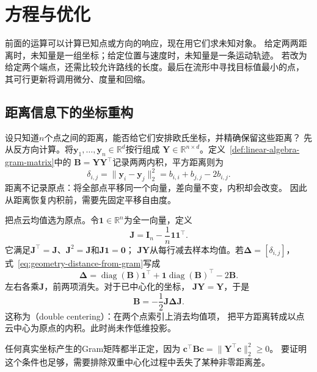 \section{方程与优化}
\label{sec:geometry-equations-optimization}

前面的运算可以计算已知点或方向的响应，现在用它们求未知对象。
给定两两距离时，未知量是一组坐标；给定位置与速度时，未知量是一条运动轨迹。
若改为给定两个端点，还需比较允许路线的长度。最后在流形中寻找目标值最小的点，
其可行更新将调用微分、度量和回缩。

\subsection{距离信息下的坐标重构}
\label{sec:geometry-distance-coordinate-embedding}

设只知道$n$个点之间的距离，能否给它们安排欧氏坐标，并精确保留这些距离？
先从反方向计算。将$\bm y_1,\ldots,\bm y_n\in\mathbb R^d$按行组成
$\bm Y\in\mathbb R^{n\times d}$。定义~\ref{def:linear-algebra-gram-matrix}中的
$\bm B=\bm Y\bm Y^\top$记录两两内积，平方距离则为
\begin{equation}
  \delta_{i,j}=\lVert\bm y_i-\bm y_j\rVert_2^2
  =b_{i,i}+b_{j,j}-2b_{i,j}.
  \label{eq:geometry-distance-from-gram}
\end{equation}
距离不记录原点：将全部点平移同一个向量，差向量不变，内积却会改变。
因此从距离恢复内积前，需要先固定平移自由度。

把点云均值选为原点。令$\bm1\in\mathbb R^n$为全一向量，定义
\begin{equation}
  \bm J=\bm I_n-\frac1n\bm1\bm1^\top.
  \label{eq:geometry-centering-matrix}
\end{equation}
它满足$\bm J^\top=\bm J$、$\bm J^2=\bm J$和$\bm J\bm1=\bm0$；
$\bm J\bm Y$从每行减去样本均值。若$\bm\Delta=[\delta_{i,j}]$，
式~\eqref{eq:geometry-distance-from-gram}写成
\[
  \bm\Delta=\operatorname{diag}(\bm B)\bm1^\top
  +\bm1\operatorname{diag}(\bm B)^\top-2\bm B.
\]
左右各乘$\bm J$，前两项消失。对于已中心化的坐标，
$\bm J\bm Y=\bm Y$，于是
\begin{equation}
  \bm B=-\frac12\bm J\bm\Delta\bm J.
  \label{eq:geometry-double-centering}
\end{equation}
这称为（double centering）：在两个点索引上消去均值项，
把平方距离转成以点云中心为原点的内积。此时尚未作低维投影。

任何真实坐标产生的Gram矩阵都半正定，因为
$\bm c^\top\bm B\bm c=\lVert\bm Y^\top\bm c\rVert_2^2\geq0$。
要证明这个条件也足够，需要排除双重中心化过程中丢失了某种非零距离差。

